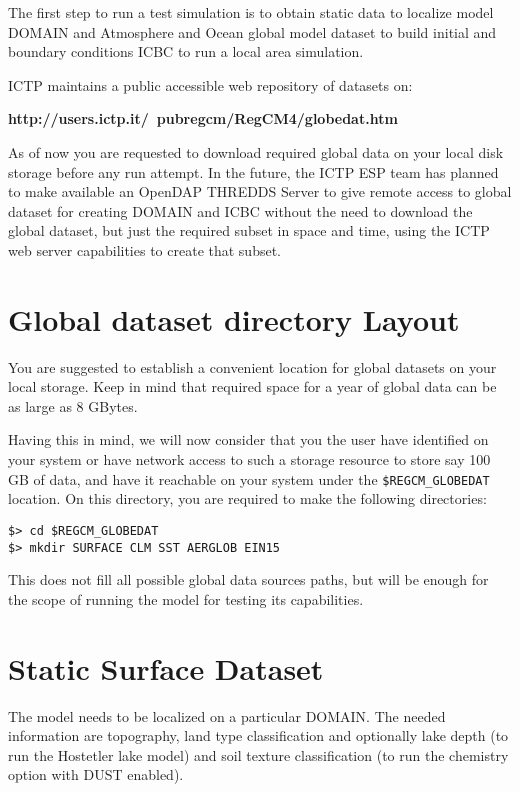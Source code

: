 %
%

The first step to run a test simulation is to obtain static data to localize
model DOMAIN and Atmosphere and Ocean global model dataset to build initial
and boundary conditions ICBC to run a local area simulation.

ICTP maintains a public accessible web repository of datasets on:

{\bf http://users.ictp.it/~pubregcm/RegCM4/globedat.htm}

As of now you are requested to download required global data on your local disk
storage before any run attempt. In the future, the ICTP ESP team has
planned to make available an OpenDAP THREDDS Server to give remote access
to global dataset for creating DOMAIN and ICBC without the need to
download the global dataset, but just the required subset in space and time,
using the ICTP web server capabilities to create that subset.

\section{Global dataset directory Layout}

You are suggested to establish a convenient location for global datasets
on your local storage. Keep in mind that required space for a year of global
data can be as large as 8 GBytes.

Having this in mind, we will now consider that you the user have identified
on your system or have network access to such a storage resource to store say
100 GB of data, and have it reachable on your system under the
\verb=$REGCM_GLOBEDAT= location.
On this directory, you are required to make the following directories:

\begin{Verbatim}
$> cd $REGCM_GLOBEDAT
$> mkdir SURFACE CLM SST AERGLOB EIN15
\end{Verbatim}

This does not fill all possible global data sources paths, but will be enough
for the scope of running the model for testing its capabilities.

\section{Static Surface Dataset}

The model needs to be localized on a particular DOMAIN. The needed information
are topography, land type classification and optionally lake depth (to run the
Hostetler lake model) and soil texture classification (to run the chemistry option
with DUST enabled).

